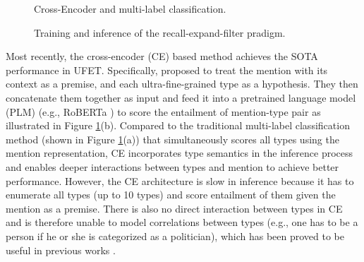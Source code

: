 \documentclass[11pt]{article}
\begin{document}
\begin{figure}
    \centering
    \caption{Cross-Encoder and multi-label classification.}
    \label{fig:mlc_ce}
\end{figure}

\begin{figure*}[t]
    \centering
    \caption{Training and inference of the recall-expand-filter pradigm.}
    \label{fig:paradigm}
\end{figure*}

Most recently, the cross-encoder (CE) based method \cite{lite} achieves the SOTA performance in UFET. Specifically, \citet{lite} proposed to treat the mention with its context as a premise, and each ultra-fine-grained type as a hypothesis. They then concatenate them together as input and feed it into a pretrained language model (PLM) (e.g., RoBERTa \cite{liu2019roberta}) to score the entailment of mention-type pair as illustrated in Figure \ref{fig:mlc_ce}(b). Compared to the traditional multi-label classification method (shown in Figure \ref{fig:mlc_ce}(a)) that simultaneously scores all types using the mention representation, CE incorporates type semantics in the inference process and enables deeper interactions between types and mention to achieve better performance. However, the CE architecture is slow in inference because it has to enumerate all types (up to 10 types) and score entailment of them given the mention as a premise. There is also no direct interaction between types in CE and is therefore unable to model correlations between types (e.g., one has to be a person if he or she is categorized as a politician), which has been proved to be useful in previous works \cite{npcrf, xiong-etal-2019-imposing}.
\end{document}
